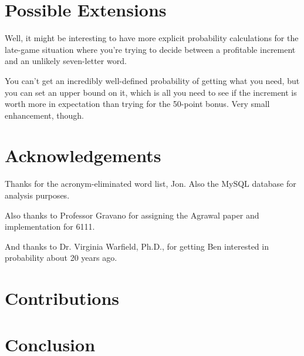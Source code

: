 \documentclass[11pt]{article}
\begin{document}
\section{Possible Extensions}

Well, it might be interesting to have more explicit probability calculations for the late-game situation where you're trying to decide between a profitable increment and an unlikely seven-letter word.

You can't get an incredibly well-defined probability of getting what you need, but you can set an upper bound on it, which is all you need to see if the increment is worth more in expectation than trying for the 50-point bonus.  Very small enhancement, though.



\section{Acknowledgements}

Thanks for the acronym-eliminated word list, Jon.  Also the MySQL database for analysis purposes.

Also thanks to Professor Gravano for assigning the Agrawal paper and implementation for 6111.

And thanks to Dr. Virginia Warfield, Ph.D., for getting Ben interested in probability about 20 years ago.

\section{Contributions}



\section{Conclusion}
\end{document}
